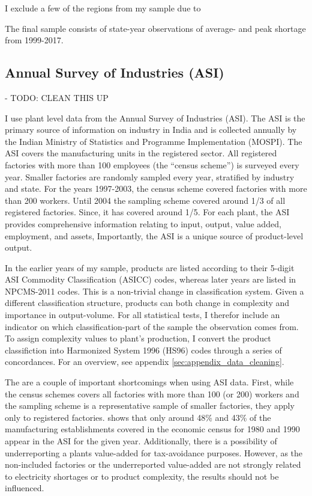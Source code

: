 \documentclass[11pt]{article}
\begin{document}
I exclude a few of the regions from my sample due to 

The final sample consists of state-year observations of average- and peak shortage from 1999-2017.

\subsection{Annual Survey of Industries (ASI)}%
\label{sub:annual_survey_of_industries_asi}

- TODO: CLEAN THIS UP 

I use plant level data from the Annual Survey of Industries (ASI). The ASI is the primary source of information on industry in India and is collected annually by the Indian Ministry of Statistics and Programme Implementation (MOSPI). The ASI covers the manufacturing units in the registered sector. All registered factories with more than 100 employees (the ``census scheme'') is surveyed every year. Smaller factories are randomly sampled every year, stratified by industry and state. For the years 1997-2003, the census scheme covered factories with more than 200 workers. Until 2004 the sampling scheme covered around 1/3 of all registered factories. Since, it has covered around 1/5. For each plant, the ASI provides comprehensive information relating to input, output, value added, employment, and assets, Importantly, the ASI is a unique source of product-level output. 

In the earlier years of my sample, products are listed according to their 5-digit ASI Commodity Classification (ASICC) codes, whereas later years are listed in NPCMS-2011 codes. This is a non-trivial change in classification system. Given a different classification structure, products can both change in complexity and importance in output-volume. For all statistical tests, I therefor include an indicator on which classification-part of the sample the observation comes from. To assign complexity values to plant's production, I convert the product classifiction into Harmonized System 1996 (HS96) codes through a series of concordances. For an overview, see appendix \ref{sec:appendix_data_cleaning}.

The are a couple of important shortcomings when using ASI data. First, while the census schemes covers all factories with more than 100 (or 200) workers and the sampling scheme is a representative sample of smaller factories, they apply only to registered factories. \cite{nagaraj_how_2002} shows that only around 48\% and 43\% of the manufacturing establishments covered in the economic census for 1980 and 1990 appear in the ASI for the given year. Additionally, there is a possibility of underreporting a plants value-added for tax-avoidance purposes. However, as the non-included factories or the underreported value-added are not strongly related to electricity shortages or to product complexity, the results should not be influenced. 
\end{document}
